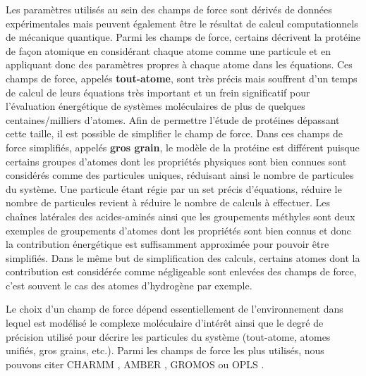 Les paramètres utilisés au sein des champs de force sont dérivés de données expérimentales mais peuvent également être le résultat de calcul computationnels de mécanique quantique. Parmi les champs de force, certains décrivent la protéine de façon atomique en considérant chaque atome comme une particule et en appliquant donc des paramètres propres à chaque atome dans les équations. Ces champs de force, appelés \textbf{tout-atome}, sont très précis mais souffrent d'un temps de calcul de leurs équations très important et un frein significatif pour l'évaluation énergétique de systèmes moléculaires de plus de quelques centaines/milliers d'atomes. Afin de permettre l'étude de protéines dépassant cette taille, il est possible de simplifier le champ de force. Dans ces champs de force simplifiés, appelés \textbf{gros grain}, le modèle de la protéine est différent puisque certains groupes d'atomes dont les propriétés physiques sont bien connues sont considérés comme des particules uniques, réduisant ainsi le nombre de particules du système. Une particule étant régie par un set précis d'équations, réduire le nombre de particules revient à réduire le nombre de calculs à effectuer. Les chaînes latérales des acides-aminés ainsi que les groupements méthyles sont deux exemples de groupements d'atomes dont les propriétés sont bien connus et donc la contribution énergétique est suffisamment approximée pour pouvoir être simplifiés. Dans le même but de simplification des calculs, certains atomes dont la contribution est considérée comme négligeable sont enlevées des champs de force, c'est souvent le cas des atomes d'hydrogène par exemple.

Le choix d'un champ de force dépend essentiellement de l'environnement dans lequel est modélisé le complexe moléculaire d'intérêt ainsi que le degré de précision utilisé pour décrire les particules du système (tout-atome, atomes unifiés, gros grains, etc.). Parmi les champs de force les plus utilisés, nous pouvons citer CHARMM \cite{brooks2009charmm}, AMBER \cite{pearlman1995amber}, GROMOS \cite{oostenbrink2004biomolecular} ou OPLS \cite{jorgensen1996development}.

